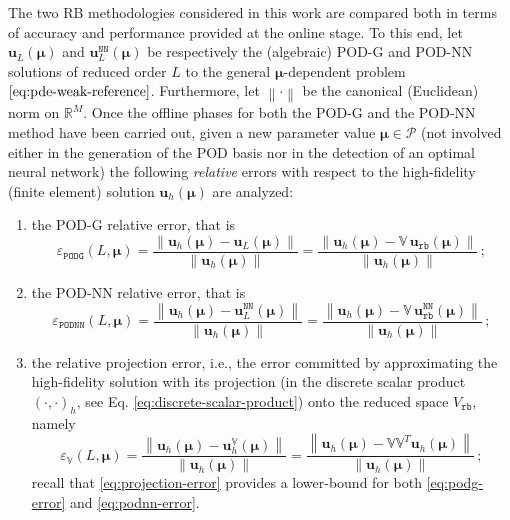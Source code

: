 \documentclass[12pt, a4paper, twoside, openright, notitlepage]{report}
\numberwithin{equation}{chapter}
\theoremstyle{theorem}
\theoremstyle{definition}
\theoremstyle{remark}
\theoremstyle{proposition}
\numberwithin{figure}{chapter}
\newcommand{\norm}[1]{\left\lVert#1\right\rVert}
\newcommand{\bg}[1]{\boldsymbol{#1}}
\begin{document}
		The two RB methodologies considered in this work are compared both in terms of accuracy and performance provided at the online stage. To this end, let $\mathbf{u}_L(\bg{\mu})$ and $\mathbf{u}_L^{\texttt{NN}}(\bg{\mu})$ be respectively the (algebraic) POD-G and POD-NN solutions of reduced order $L$ to the general $\bg{\mu}$-dependent problem $\eqref{eq:pde-weak-reference}$. Furthermore, let $\norm{\cdot}$ be the canonical (Euclidean) norm on $\mathbb{R}^M$. Once the offline phases for both the POD-G and the POD-NN method have been carried out, given a new parameter value $\bg{\mu} \in \mathcal{P}$ (not involved either in the generation of the POD basis nor in the detection of an optimal neural network) the following \emph{relative} errors with respect to the high-fidelity (finite element) solution $\mathbf{u}_h(\bg{\mu})$ are analyzed:
		\begin{enumerate}[label=(\alph*)]
			\item the POD-G relative error, that is
			\begin{equation}
				\label{eq:podg-error}
				\varepsilon_{\texttt{PODG}}^{}(L, \bg{\mu}) = \dfrac{\norm{\mathbf{u}_h(\bg{\mu}) - \mathbf{u}_L(\bg{\mu})}}{\norm{\mathbf{u}_h(\bg{\mu})}} = \dfrac{\norm{\mathbf{u}_h(\bg{\mu}) - \mathbb{V} \, \mathbf{u}_{\texttt{rb}}(\bg{\mu})}}{\norm{\mathbf{u}_h(\bg{\mu})}} \, ;
			\end{equation} 
			\item the POD-NN relative error, that is
			\begin{equation}
				\label{eq:podnn-error}
				\varepsilon_{\texttt{PODNN}}^{}(L, \bg{\mu}) = \dfrac{\norm{\mathbf{u}_h(\bg{\mu}) - \mathbf{u}_L^{\texttt{NN}}(\bg{\mu})}}{\norm{\mathbf{u}_h(\bg{\mu})}} = \dfrac{\norm{\mathbf{u}_h(\bg{\mu}) - \mathbb{V} \, \mathbf{u}_{\texttt{rb}}^{\texttt{NN}}(\bg{\mu})}}{\norm{\mathbf{u}_h(\bg{\mu})}} \, ;
			\end{equation} 
			\item the relative projection error, i.e., the error committed by approximating the high-fidelity solution with its projection (in the discrete scalar product $(\cdot,\cdot)_h$, see Eq. \eqref{eq:discrete-scalar-product}) onto the reduced space $V_{\texttt{rb}}$, namely
			\begin{equation}
				\label{eq:projection-error}
				\varepsilon_{\mathbb{V}}^{}(L, \bg{\mu}) = \dfrac{\norm{\mathbf{u}_h(\bg{\mu}) - \mathbf{u}_h^{\mathbb{V}}(\bg{\mu})}}{\norm{\mathbf{u}_h(\bg{\mu})}} = \dfrac{\norm{\mathbf{u}_h(\bg{\mu}) - \mathbb{V} \mathbb{V}^T \mathbf{u}_h(\bg{\mu})}}{\norm{\mathbf{u}_h(\bg{\mu})}} \, ;
			\end{equation}
			recall that \eqref{eq:projection-error} provides a lower-bound for both \eqref{eq:podg-error} and \eqref{eq:podnn-error}. 
		\end{enumerate}
\end{document}
